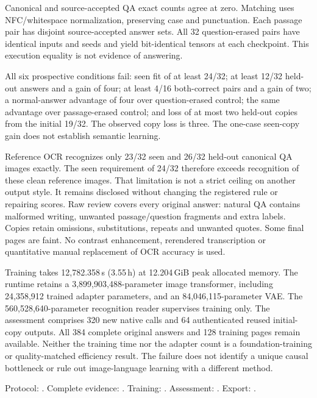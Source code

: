 Canonical and source-accepted QA exact counts agree at zero. Matching uses
NFC/whitespace normalization, preserving case and punctuation. Each passage
pair has disjoint source-accepted answer sets. All 32 question-erased pairs
have identical inputs and seeds and yield bit-identical tensors at each
checkpoint. This execution equality is not evidence of answering.

All six prospective conditions fail: seen fit of at least 24/32; at least
12/32 held-out answers and a gain of four; at least 4/16 both-correct pairs
and a gain of two; a normal-answer advantage of four over question-erased
control; the same advantage over passage-erased control; and loss of at most
two held-out copies from the initial 19/32. The observed copy loss is three.
The one-case seen-copy gain does not establish semantic learning.

Reference OCR recognizes only 23/32 seen and 26/32 held-out canonical QA
images exactly. The seen requirement of 24/32 therefore exceeds recognition
of these clean reference images. That limitation is not a strict ceiling on
another output style. It remains disclosed without changing the registered
rule or repairing scores. Raw review covers every original answer: natural
QA contains malformed writing, unwanted passage/question fragments and extra
labels. Copies retain omissions, substitutions, repeats and unwanted quotes.
Some final pages are faint. No contrast enhancement, rerendered transcription
or quantitative manual replacement of OCR accuracy is used.

Training takes 12,782.358\,s (3.55\,h) at 12.204\,GiB peak allocated memory.
The runtime retains a 3,899,903,488-parameter image transformer, including
24,358,912 trained adapter parameters, and an 84,046,115-parameter VAE.
The 560,528,640-parameter recognition reader supervises training only.
The assessment comprises 320 new native calls and 64 authenticated reused
initial-copy outputs. All 384 complete original answers and 128 training
pages remain available. Neither the training time nor the adapter count is
a foundation-training or quality-matched efficiency result. The failure
does not identify a unique causal bottleneck or rule out image-language
learning with a different method.

{\footnotesize\raggedright
Protocol: .
Complete evidence: .
Training: .
Assessment: .
Export: .\par}


